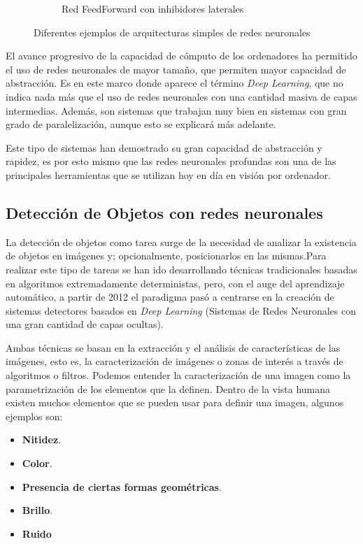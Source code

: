 \begin{figure}[H]
\begin{subfigure}[b]{0.45\textwidth}
        \caption{Red FeedForward con inhibidores laterales}
        \label{fig:c}
    \end{subfigure}
    \caption{Diferentes ejemplos de arquitecturas simples de redes neuronales\cite{duNeuralNetworksStatistical2013}}
    \label{fig:ArquitecturasRedes}
\end{figure}

El avance progresivo de la capacidad de cómputo de los ordenadores ha permitido el uso de redes neuronales de mayor tamaño, que permiten mayor capacidad de abstracción. Es en este marco donde aparece el término 
\textit{Deep Learning}, que no indica nada más que el uso de redes neuronales con una cantidad masiva de capas intermedias. Además, son sistemas que trabajan muy bien en sistemas con gran grado de paralelización, 
aunque esto se explicará más adelante.

Este tipo de sistemas han demostrado su gran capacidad de abstracción y rapidez, es por esto mismo que las redes neuronales profundas son una de las principales herramientas que se utilizan hoy en día en 
visión por ordenador.

\clearpage
\subsection{Detección de Objetos con redes neuronales}

La detección de objetos como tarea surge de la necesidad de analizar la existencia de objetos en imágenes y; opcionalmente, posicionarlos en las mismas.Para realizar este tipo de tareas se han ido 
desarrollando técnicas tradicionales basadas en algoritmos extremadamente deterministas, pero, con el auge del aprendizaje automático, a partir de 2012\cite{zouObjectDetection202023} 
el paradigma pasó a centrarse en la creación de sistemas detectores basados en \textit{Deep Learning} (Sistemas de Redes Neuronales con una gran cantidad de capas ocultas).

Ambas técnicas se basan en la extracción y el análisis de características de las imágenes, esto es, la caracterización de imágenes o zonas de interés a través de algoritmos o filtros. Podemos entender la caracterización 
de una imagen como la parametrización de los elementos que la definen. Dentro de la vista humana existen muchos elementos que se pueden usar para definir una imagen, algunos ejemplos son:
\begin{itemize}
    \item \textbf{Nitidez}.
    \item \textbf{Color}.
    \item \textbf{Presencia de ciertas formas geométricas}.
    \item \textbf{Brillo}.
    \item \textbf{Ruido}
\end{itemize}


